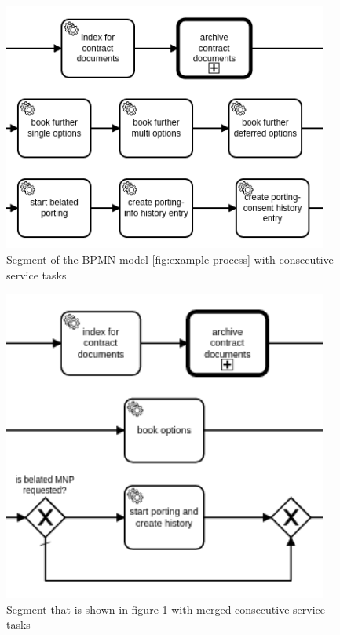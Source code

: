 \begin{minipage}[t]{0.5\textwidth}
\begin{figure}[H]
	\centering
	\includegraphics[width=0.95\textwidth]{graphics/case-study-merge-org-2}
	\caption{Segment of the BPMN model \ref{fig:example-process} with consecutive service tasks}
	\label{fig:merge-2-org}
\end{figure}
\end{minipage}
\begin{minipage}[t]{0.5\textwidth}
\begin{figure}[H]
	\centering
	\includegraphics[width=0.95\textwidth]{graphics/case-study-merge-new-2}
	\caption{Segment that is shown in figure \ref{fig:merge-2-org} with merged consecutive service tasks}
	\label{fig:merge-2-new}
\end{figure}
\end{minipage}

